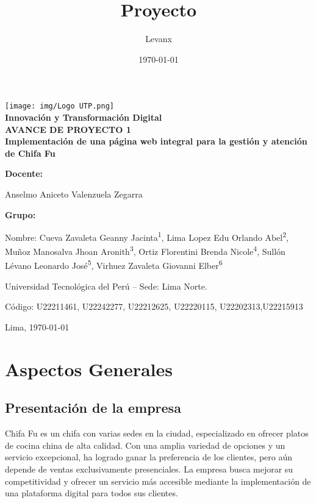 \documentclass{article}
\title{Proyecto}
\author{Levanx}
\date{\today}
\begin{document}
\begin{doublespace}
\begin{center}
    \vspace*{1cm}

    \centering
    \texttt{[image: img/Logo UTP.png]}\\[1cm]
    
    \large{\textbf{Innovación y Transformación Digital}} 
    \\[0.5cm] 
    
    \large{\bf AVANCE DE PROYECTO 1}
    \\[0.5cm] 
    \LARGE \textbf{{Implementación de una página web integral para la gestión y atención de Chifa Fu}}
\end{center}
\vspace{2cm}
\large{\bf Docente: }
\begin{center}
    \large{Anselmo Aniceto Valenzuela Zegarra}
\end{center}
\large{\bf Grupo: }
\begin{center}
    \large{Nombre: Cueva Zavaleta Geanny Jacinta\textsuperscript{1}, Lima Lopez Edu Orlando Abel\textsuperscript{2}, Muñoz Manosalva Jhoan Aronith\textsuperscript{3}, Ortiz Florentini Brenda Nicole\textsuperscript{4}, Sullón Lévano Leonardo José\textsuperscript{5}, Virhuez Zavaleta Giovanni Elber\textsuperscript{6}}
\end{center}
\begin{center}
    \large{ Universidad Tecnológica del Perú – Sede: Lima Norte.}
\end{center}
    
\begin{center}
    \large{Código: U22211461, U22242277, U22212625, U22220115, U22202313,U22215913}
\end{center}
\begin{center}
Lima, \today
\end{center}
\newpage
\vspace*{0.1cm}
\tableofcontents
\newpage
\vspace*{0.2cm}
\section{Aspectos Generales}
    \subsection{Presentación de la empresa}
    \noindent Chifa Fu es un chifa con varias sedes en la ciudad, especializado en ofrecer
platos de cocina china de alta calidad. Con una amplia variedad de opciones y un servicio excepcional, ha logrado ganar la preferencia de los clientes, pero aún depende de ventas exclusivamente presenciales. La empresa busca mejorar su competitividad y ofrecer un servicio más accesible mediante la implementación de una plataforma digital para todos sus clientes.


\end{doublespace}
\end{document}
